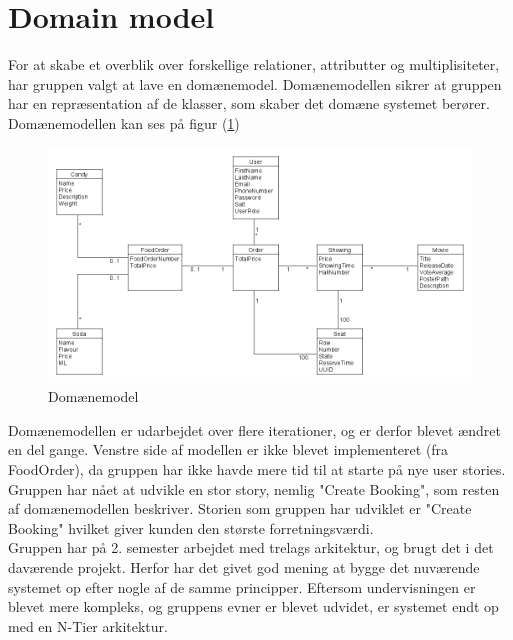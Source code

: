 ﻿\section{Domain model}
For at skabe et overblik over forskellige relationer, attributter og multiplisiteter, 
har gruppen valgt at lave en domænemodel.
Domænemodellen sikrer at gruppen har en repræsentation af de klasser, som skaber det domæne systemet berører.\\

Domænemodellen kan ses på figur (\ref{fig:domain})

\begin{figure}[H]
    \centering
    \includegraphics[width=1\textwidth]{figures/Domainmodel.png}
    \caption{Domænemodel}
    \label{fig:domain}
\end{figure}

Domænemodellen er udarbejdet over flere iterationer, og er derfor blevet ændret en del gange.
Venstre side af modellen er ikke blevet implementeret (fra FoodOrder), 
da gruppen har ikke havde mere tid til at starte på nye user stories. 
Gruppen har nået at udvikle en stor story, nemlig "Create Booking", 
som resten af domænemodellen beskriver. Storien som gruppen har udviklet er "Create Booking" 
hvilket giver kunden den største forretningsværdi.  \\

Gruppen har på 2. semester arbejdet med trelags arkitektur, og brugt det i det daværende projekt.
Herfor har det givet god mening at bygge det nuværende systemet op efter nogle af de samme principper.
Eftersom undervisningen er blevet mere kompleks, og gruppens evner er blevet udvidet, er systemet endt op med en
N-Tier arkitektur.\\